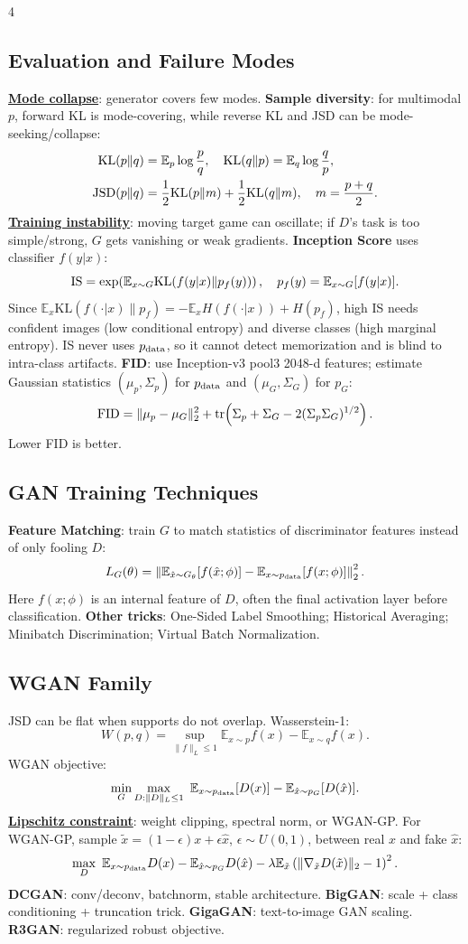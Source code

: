 \documentclass{article}
\newcommand{\key}[1]{\textbf{#1}}
\newcommand{\lowterm}[1]{\textbf{\underline{#1}}}
\newcommand{\E}{\mathbb{E}}
\newcommand{\KL}{\mathrm{KL}}
\newcommand{\1}{\mathbf 1}
\DeclareMathOperator{\tr}{tr}
\begin{document}
\begin{multicols*}{4}
\subsection{Evaluation and Failure Modes}
\lowterm{Mode collapse}: generator covers few modes. \key{Sample diversity}: for multimodal $p$, forward KL is mode-covering, while reverse KL and JSD can be mode-seeking/collapse:
\[
\begin{aligned}
\KL(p\|q)&=\E_p\log\frac{p}{q},\quad
\KL(q\|p)=\E_q\log\frac{q}{p},\\
{\rm JSD}(p\|q)&=\frac12\KL(p\|m)+\frac12\KL(q\|m),\quad m=\frac{p+q}{2}.
\end{aligned}
\]
\lowterm{Training instability}: moving target game can oscillate; if $D$'s task is too simple/strong, $G$ gets vanishing or weak gradients. \key{Inception Score} uses classifier $f(y|x)$:
\[
{\rm IS}=\exp\!\left(\E_{x\sim G}\KL(f(y|x)\|p_f(y))\right),\quad
p_f(y)=\E_{x\sim G}[f(y|x)].
\]
Since $\E_x\KL(f(\cdot|x)\|p_f)=-\E_xH(f(\cdot|x))+H(p_f)$, high IS needs confident images (low conditional entropy) and diverse classes (high marginal entropy). IS never uses $p_{\rm data}$, so it cannot detect memorization and is blind to intra-class artifacts. \key{FID}: use Inception-v3 pool3 2048-d features; estimate Gaussian statistics $(\mu_p,\Sigma_p)$ for $p_{\rm data}$ and $(\mu_G,\Sigma_G)$ for $p_G$:
\[
{\rm FID}=\|\mu_p-\mu_G\|_2^2+
\tr\!\left(\Sigma_p+\Sigma_G-2(\Sigma_p\Sigma_G)^{1/2}\right).
\]
Lower FID is better.

\subsection{GAN Training Techniques}
\key{Feature Matching}: train $G$ to match statistics of discriminator features instead of only fooling $D$:
\[
L_G(\theta)=\left\|
\E_{\hat x\sim G_\theta}[f(\hat x;\phi)]
-\E_{x\sim p_{\rm data}}[f(x;\phi)]
\right\|_2^2.
\]
Here $f(x;\phi)$ is an internal feature of $D$, often the final activation layer before classification.
\key{Other tricks}: One-Sided Label Smoothing; Historical Averaging; Minibatch Discrimination; Virtual Batch Normalization.

\subsection{WGAN Family}
JSD can be flat when supports do not overlap. Wasserstein-1:
\[
W(p,q)=\sup_{\|f\|_L\le1}\E_{x\sim p}f(x)-\E_{x\sim q}f(x).
\]
WGAN objective:
\[
\min_G\max_{D:\|D\|_L\le1}\ \E_{x\sim p_{\rm data}}[D(x)]-\E_{\hat x\sim p_G}[D(\hat x)].
\]
\lowterm{Lipschitz constraint}: weight clipping, spectral norm, or WGAN-GP. For WGAN-GP, sample $\tilde x=(1-\epsilon)x+\epsilon\hat x$, $\epsilon\sim U(0,1)$, between real $x$ and fake $\hat x$:
\[
\max_D\ \E_{x\sim p_{\rm data}}D(x)-\E_{\hat x\sim p_G}D(\hat x)
-\lambda\E_{\tilde x}\left(\|\nabla_{\tilde x}D(\tilde x)\|_2-1\right)^2.
\]
\key{DCGAN}: conv/deconv, batchnorm, stable architecture. \key{BigGAN}: scale + class conditioning + truncation trick. \key{GigaGAN}: text-to-image GAN scaling. \key{R3GAN}: regularized robust objective.


\end{multicols*}
\end{document}
